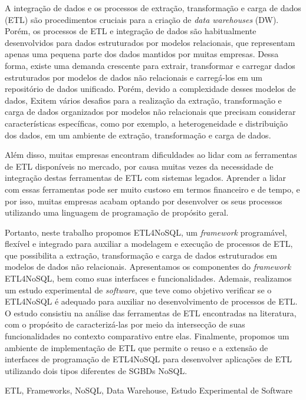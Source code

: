 

A integração de dados e os processos de extração, transformação e carga de dados (ETL) são procedimentos cruciais para a criação de \textit{data warehouses} (DW). Porém, os processos de ETL e integração de dados são habitualmente desenvolvidos para dados estruturados por modelos relacionais, que representam apenas uma pequena parte dos dados mantidos por muitas empresas. Dessa forma, existe uma demanda crescente para extrair, transformar e carregar dados estruturados por modelos de dados não relacionais e carregá-los em um repositório de dados unificado. Porém, devido a complexidade desses modelos de dados, Exitem vários desafios para a realização da extração, transformação e carga de dados organizados por modelos não relacionais que precisam considerar características específicas, como por exemplo, a heterogeneidade e distribuição dos dados, em um ambiente de extração, transformação e carga de dados.

Além disso, muitas empresas encontram dificuldades ao lidar com as ferramentas de ETL disponíveis no mercado, por causa muitas vezes da necessidade de integração destas ferramentas de ETL com sistemas legados. Aprender a lidar com essas ferramentas pode ser muito custoso em termos financeiro e de tempo, e por isso, muitas empresas acabam optando por desenvolver os seus processos utilizando uma linguagem de programação de propósito geral.

Portanto, neste trabalho propomos ETL4NoSQL, um \textit{framework} programável, flexível e integrado para auxiliar a modelagem e execução de processos de ETL, que possibilita a extração, transformação e carga de dados estruturados em modelos de dados não relacionais. Apresentamos os componentes do \textit{framework} ETL4NoSQL, bem como suas interfaces e funcionalidades. Ademais, realizamos um estudo experimental de \textit{software}, que teve como objetivo verificar se o ETL4NoSQL é adequado para auxiliar no desenvolvimento de processos de ETL. O estudo consistiu na análise das ferramentas de ETL encontradas na literatura, com o propósito de caracterizá-las por meio da intersecção de suas funcionalidades no contexto comparativo entre elas. Finalmente, propomos um ambiente de implementação de ETL que permite o reuso e a extensão de interfaces de programação de ETL4NoSQL para desenvolver aplicações de ETL utilizando dois tipos diferentes de SGBDs NoSQL.


\begin{keywords}
ETL, Frameworks, NoSQL, Data Warehouse, Estudo Experimental de Software
\end{keywords}